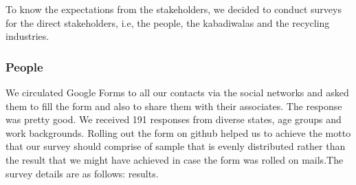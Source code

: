 \documentclass{article}
\begin{document}
\par To know the expectations from the stakeholders, we decided to conduct surveys for the direct stakeholders, i.e, the people, the kabadiwalas and the recycling industries.

\subsubsection{People}
\par  We circulated Google Forms to all our contacts via the social networks and asked them to fill the form and also to share them with their associates. The response was pretty good. We received 191 responses from diverse states, age groups and work backgrounds. Rolling out the form on github helped us to achieve the motto that our survey should comprise of sample that is evenly distributed rather than the result that we might have achieved in case the form was rolled on mails.The survey details are as follows:
 results.
\end{document}
